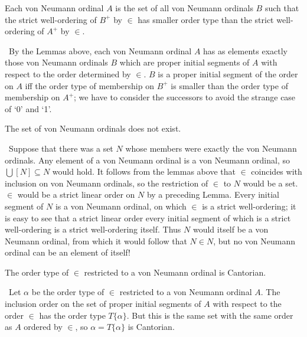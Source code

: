\begin{lemme}
 Each von Neumann ordinal $A$ is the set of all von
 Neumann ordinals $B$ such that the strict well-ordering of $B^+$ by $\in$
 has smaller order type than the strict well-ordering
 of $A^+$ by $\in$.
\end{lemme}

\preuve\ By the Lemmas above, each von Neumann
ordinal $A$ has as elements exactly those von Neumann ordinals $B$ which are
proper initial segments of $A$ with respect to the order determined by $\in$.
$B$ is a proper initial segment of the order on $A$ iff the order type
of membership on $B^+$ is smaller than the order type of membership on
$A^+$; we have to consider the successors to avoid the strange case of
`0' and `1'.
\finpreuve

\begin{thm}
 The set of von Neumann ordinals does not exist.
\end{thm}

\preuve\ Suppose that there was a set $N$ whose members were
exactly the von Neumann ordinals.  Any element of a von Neumann
ordinal is a von Neumann ordinal, so $\bigcup[N] \subseteq N$ would
hold.  It follows from the lemmas above that $\in$ coincides with
inclusion on von Neumann ordinals, so the restriction of $\in$
to $N$ would be a set.  $\in$ would be a strict linear order on $N$ by a
preceding Lemma.  Every initial segment of $N$ is a von Neumann
ordinal, on which $\in$ is a strict well-ordering; it is
easy to see that a strict linear order every initial segment of which is a strict well-ordering is a strict
well-ordering itself.  Thus $N$ would itself be a von Neumann ordinal, from which it would follow that $N \in N$,
but no von Neumann ordinal can be an element of itself!
\finpreuve

\begin{thm}
 The order type of $\in$ restricted to a von Neumann
 ordinal is Cantorian.
\end{thm}

\preuve\ Let $\alpha$ be the order type of $\in$ restricted to a
von Neumann ordinal $A$.  The inclusion order on the set of proper
initial segments of $A$ with respect to the order $\in$
has the order type $T\{\alpha\}$.  But
this is the same set with the same order as $A$ ordered by $\in$, so
$\alpha= T\{\alpha\}$ is Cantorian.
\finpreuve

